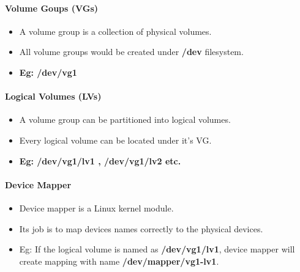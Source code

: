\begin{flushleft}
	
	\bigskip
	\bigskip
	\paragraph{Volume Goups (VGs)}
	\begin{itemize}
		\item A volume group is a collection of physical volumes.
		\item All volume groups would be created under \textbf{/dev} filesystem.
		\item \textbf{Eg: /dev/vg1}
	\end{itemize}

	\bigskip
	\bigskip
	\paragraph{Logical Volumes (LVs)}
	\begin{itemize}
		\item A volume group can be partitioned into logical volumes.
		\item Every logical volume can be located under it's VG.
		\item \textbf{Eg: /dev/vg1/lv1 , /dev/vg1/lv2 etc.}
	\end{itemize}

	\bigskip
	\bigskip
	\paragraph{Device Mapper}
	\begin{itemize}
		\item Device mapper is a Linux kernel module.
		\item Its job is to map devices names correctly to the physical devices.
		\item Eg: If the logical volume is named as \textbf{/dev/vg1/lv1}, device mapper will create mapping with name \textbf{/dev/mapper/vg1-lv1}.
	\end{itemize}

	

\end{flushleft}

\newpage


